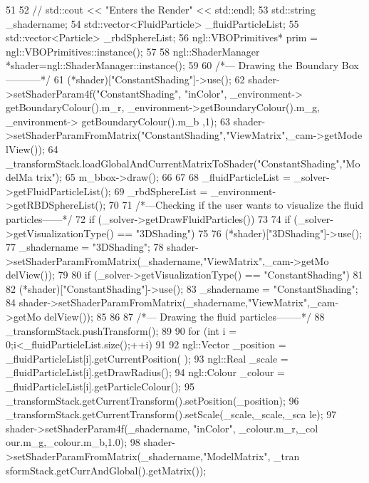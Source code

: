\begin{DoxyCode}
51 {
52 //    std::cout << "Enters the Render" << std::endl;
53     std::string _shadername;
54     std::vector<FluidParticle> _fluidParticleList;
55     std::vector<Particle> _rbdSphereList;
56     ngl::VBOPrimitives* prim = ngl::VBOPrimitives::instance();
57 
58     ngl::ShaderManager *shader=ngl::ShaderManager::instance();
59 
60     /*--- Drawing the Boundary Box -----------*/
61     (*shader)["ConstantShading"]->use();
62     shader->setShaderParam4f("ConstantShading", "inColor", _environment->
      getBoundaryColour().m_r, _environment->getBoundaryColour().m_g, _environment->
      getBoundaryColour().m_b ,1);
63     shader->setShaderParamFromMatrix("ConstantShading","ViewMatrix",_cam->getMode
      lView());
64     _transformStack.loadGlobalAndCurrentMatrixToShader("ConstantShading","ModelMa
      trix");
65             m_bbox->draw();
66 
67 
68     _fluidParticleList = _solver->getFluidParticleList();
69     _rbdSphereList = _environment->getRBDSphereList();
70 
71     /*---Checking if the user wants to visualize the fluid particles------*/
72     if (_solver->getDrawFluidParticles())
73     {
74         if (_solver->getVisualizationType() == "3DShading")
75         {
76             (*shader)["3DShading"]->use();
77             _shadername = "3DShading";
78             shader->setShaderParamFromMatrix(_shadername,"ViewMatrix",_cam->getMo
      delView());
79         }
80         if (_solver->getVisualizationType() == "ConstantShading")
81         {
82              (*shader)["ConstantShading"]->use();
83             _shadername = "ConstantShading";
84             shader->setShaderParamFromMatrix(_shadername,"ViewMatrix",_cam->getMo
      delView());
85         }
86 
87         /*--- Drawing the fluid particles--------*/
88         _transformStack.pushTransform();
89         {
90             for (int i = 0;i<_fluidParticleList.size();++i)
91             {
92                 ngl::Vector _position = _fluidParticleList[i].getCurrentPosition(
      );
93                 ngl::Real _scale = _fluidParticleList[i].getDrawRadius();
94                 ngl::Colour _colour = _fluidParticleList[i].getParticleColour();
95                 _transformStack.getCurrentTransform().setPosition(_position);
96                 _transformStack.getCurrentTransform().setScale(_scale,_scale,_sca
      le);
97                 shader->setShaderParam4f(_shadername, "inColor", _colour.m_r,_col
      our.m_g,_colour.m_b,1.0);
98                 shader->setShaderParamFromMatrix(_shadername,"ModelMatrix", _tran
      sformStack.getCurrAndGlobal().getMatrix());
}}}}
\end{DoxyCode}
